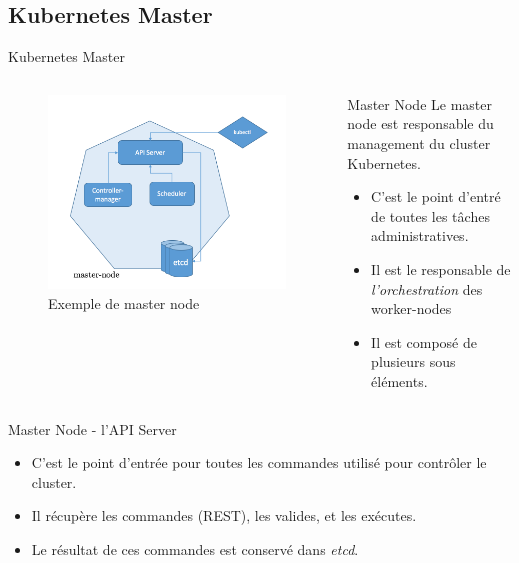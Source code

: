 \documentclass{bredelebeamer}
\begin{document}
\subsection{Kubernetes Master}
\begin{frame}{Kubernetes Master}
\begin{columns}
\begin{column}{0.4\textwidth}
\begin{figure}
\centering
\includegraphics[scale=0.25]{images/img25.png}
\caption{Exemple de master node}
\end{figure}
\end{column}
\begin{column}{0.6\textwidth}
\begin{block}{Master Node}
Le master node est responsable du management du cluster Kubernetes.
\begin{itemize}
\item C'est le point d'entré de toutes les tâches administratives.
\item Il est le responsable de \textit{l'orchestration} des worker-nodes 
\item Il est composé de plusieurs sous éléments.
\end{itemize}
\end{block}
\end{column}
\end{columns}\pause
\begin{block}{Master Node - l'API Server}
\begin{itemize}
\item C'est le point d'entrée pour toutes les commandes utilisé pour contrôler le cluster.
\item Il récupère les commandes (REST), les valides, et les exécutes.  
\item Le résultat de ces commandes est conservé dans \textit{etcd}.
\end{itemize}

\end{block}
\end{frame}
\end{document}
